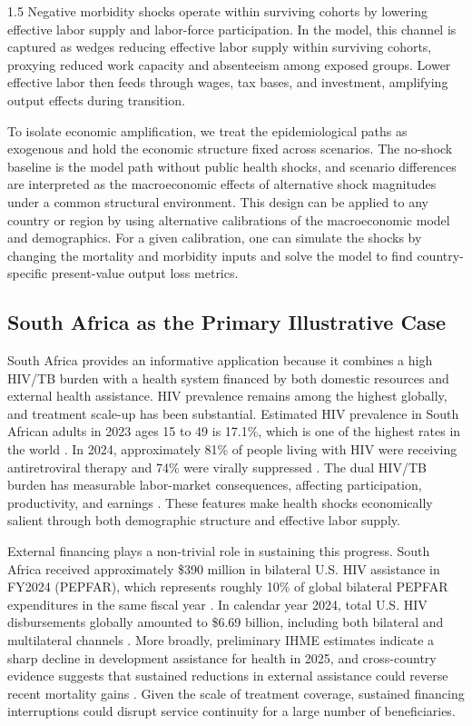 \documentclass[letterpaper,12pt]{article}
\theoremstyle{definition}
\begin{document}
\begin{spacing}{1.5}
  Negative morbidity shocks operate within surviving cohorts by lowering effective labor supply and labor-force participation. In the model, this channel is captured as wedges reducing effective labor supply within surviving cohorts, proxying reduced work capacity and absenteeism among exposed groups. Lower effective labor then feeds through wages, tax bases, and investment, amplifying output effects during transition.

  To isolate economic amplification, we treat the epidemiological paths as exogenous and hold the economic structure fixed across scenarios. The no-shock baseline is the model path without public health shocks, and scenario differences are interpreted as the macroeconomic effects of alternative shock magnitudes under a common structural environment. This design can be applied to any country or region by using alternative calibrations of the macroeconomic model and demographics. For a given calibration, one can simulate the shocks by changing the mortality and morbidity inputs and solve the model to find country-specific present-value output loss metrics.


  \subsection{South Africa as the Primary Illustrative Case}

  South Africa provides an informative application because it combines a high HIV/TB burden with a health system financed by both domestic resources and external health assistance. HIV prevalence remains among the highest globally, and treatment scale-up has been substantial. Estimated HIV prevalence in South African adults in 2023 ages 15 to 49 is 17.1\%, which is one of the highest rates in the world \citep{CDC2026}. In 2024, approximately 81\% of people living with HIV were receiving antiretroviral therapy and 74\% were virally suppressed \citep{unaidsdatabook2025}. The dual HIV/TB burden has measurable labor-market consequences, affecting participation, productivity, and earnings \citep{ILO2018}. These features make health shocks economically salient through both demographic structure and effective labor supply.

  External financing plays a non-trivial role in sustaining this progress. South Africa received approximately \$390 million in bilateral U.S. HIV assistance in FY2024 (PEPFAR), which represents roughly 10\% of global bilateral PEPFAR expenditures in the same fiscal year \citep{PEPFAR2024Expenditures}. In calendar year 2024, total U.S. HIV disbursements globally amounted to \$6.69 billion, including both bilateral and multilateral channels \citep{KFF2024HIVDonorFunding}. More broadly, preliminary IHME estimates indicate a sharp decline in development assistance for health in 2025, and cross-country evidence suggests that sustained reductions in external assistance could reverse recent mortality gains \citep{FGH2025,silvaImpactTwoDecades2026}. Given the scale of treatment coverage, sustained financing interruptions could disrupt service continuity for a large number of beneficiaries.


\end{spacing}
\end{document}
